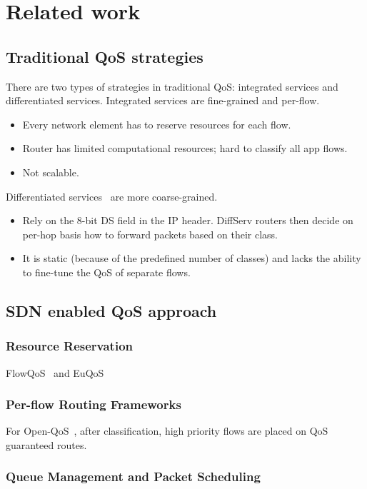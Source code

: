 \section{Related work}
\label{sect:related}
\subsection{Traditional QoS strategies}
There are two types of strategies in traditional QoS: integrated services and differentiated services.
Integrated services are fine-grained and per-flow. 
\begin{itemize}
\item Every network element has to reserve resources for each flow.
\item Router has limited computational resources; hard to classify all app flows.
\item Not scalable.
\end{itemize}

Differentiated services~\cite{DiffServ} are more coarse-grained.
\begin{itemize}
\item Rely on the 8-bit DS field in the IP header. DiffServ routers then decide on per-hop basis how to forward packets based on their class.
\item It is static (because of the predefined number of classes) and lacks the ability to fine-tune the QoS of separate flows.
\end{itemize}


\subsection{SDN enabled QoS approach}
\subsubsection{Resource Reservation}
FlowQoS~\cite{Seddiki_HotSDN14} and EuQoS~\cite{Sharma_EWSDN14}
\subsubsection{Per-flow Routing Frameworks}
For Open-QoS~\cite{Egilmez_ASPIPA12}, after classification, high priority flows are placed on QoS guaranteed routes.

\subsubsection{Queue Management and Packet Scheduling}
